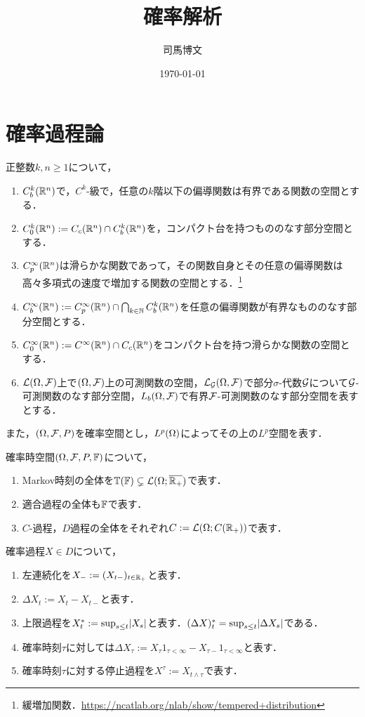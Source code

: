 \documentclass[uplatex,dvipdfmx]{jsreport}
\title{確率解析}
\author{司馬博文}
\date{\today}
\begin{document}
\tableofcontents

\chapter{確率過程論}

\begin{notation}
    正整数$k,n\ge1$について，
    \begin{enumerate}
        \item $C_b^k(\mathbb{R}^n)$で，$C^k$-級で，任意の$k$階以下の偏導関数は有界である関数の空間とする．
        \item $C_0^k(\mathbb{R}^n):=C_c(\mathbb{R}^n)\cap C_b^k(\mathbb{R}^n)$を，コンパクト台を持つもののなす部分空間とする．
        \item $C_p^\infty(\mathbb{R}^n)$は滑らかな関数であって，その関数自身とその任意の偏導関数は高々多項式の速度で増加する関数の空間とする．\footnote{緩増加関数．\url{https://ncatlab.org/nlab/show/tempered+distribution}}
        \item $C_b^\infty(\mathbb{R}^n):=C_p^\infty(\mathbb{R}^n)\cap\bigcap_{k\in\mathbb{N}}C_b^k(\mathbb{R}^n)$を任意の偏導関数が有界なもののなす部分空間とする．
        \item $C_0^\infty(\mathbb{R}^n):=C^\infty(\mathbb{R}^n)\cap C_c(\mathbb{R}^n)$をコンパクト台を持つ滑らかな関数の空間とする．
        \item $\mathcal{L}(\Omega,\mathcal{F})$上で$(\Omega,\mathcal{F})$上の可測関数の空間，$\mathcal{L}_{\mathcal{G}}(\Omega,\mathcal{F})$で部分$\sigma$-代数$\mathcal{G}$について$\mathcal{G}$-可測関数のなす部分空間，$L_b(\Omega,\mathcal{F})$で有界$\mathcal{F}$-可測関数のなす部分空間を表すとする．
    \end{enumerate}
    また，$(\Omega,\mathcal{F},P)$を確率空間とし，$L^p(\Omega)$によってその上の$L^p$空間を表す．
\end{notation}

\begin{notation}
    確率時空間$(\Omega,\mathcal{F},P,\mathbb{F})$について，
    \begin{enumerate}
        \item Markov時刻の全体を$\mathbb{T}(\mathbb{F})\subsetneq\mathcal{L}(\Omega;\overline{\mathbb{R}_+})$で表す．
        \item 適合過程の全体も$\mathbb{F}$で表す．
        \item $C$-過程，$D$過程の全体をそれぞれ$C:=\mathcal{L}(\Omega;C(\mathbb{R}_+))$で表す．
    \end{enumerate}
\end{notation}

\begin{notation}
    確率過程$X\in D$について，
    \begin{enumerate}
        \item 左連続化を$X_-:=(X_{t-})_{t\in\mathbb{R}_+}$と表す．
        \item $\Delta X_t:=X_t-X_{t-}$と表す．
        \item 上限過程を$X^*_t:=\sup_{s\le t}\lvert X_s\rvert$と表す．$(\Delta X)_t^*=\sup_{s\le t}\lvert\Delta X_s\rvert$である．
        \item 確率時刻$\tau$に対しては$\Delta X_\tau:=X_\tau1_{\tau<\infty}-X_{\tau-}1_{\tau<\infty}$と表す．
        \item 確率時刻$\tau$に対する停止過程を$X^\tau:=X_{t\land\tau}$で表す．
    \end{enumerate}
\end{notation}
\end{document}
